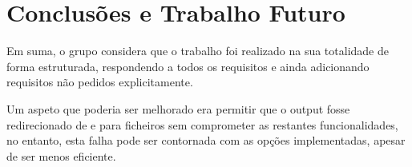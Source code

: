 \documentclass[12pt,a4paper]{report}
\begin{document}
\chapter{Conclusões e Trabalho Futuro}
    Em suma, o grupo considera que o trabalho foi realizado na sua
    totalidade de forma estruturada, respondendo a todos os requisitos e ainda
    adicionando requisitos não pedidos explicitamente.

    Um aspeto que poderia ser melhorado era permitir que o output fosse
    redirecionado de e para ficheiros sem comprometer as restantes
    funcionalidades, no entanto, esta falha pode ser contornada com as opções
    implementadas, apesar de ser menos eficiente.
\end{document}
